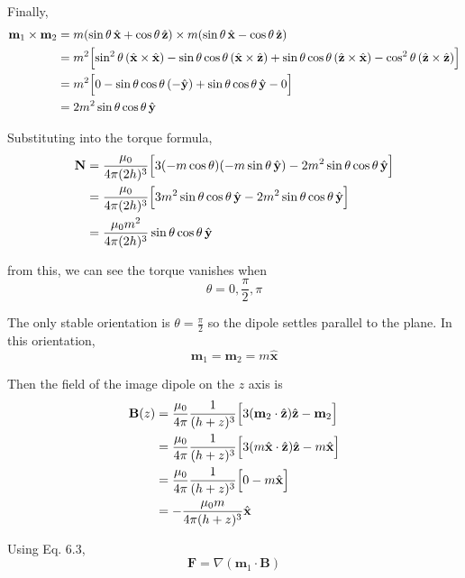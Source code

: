 \documentclass[12pt]{article}
\begin{document}
\begin{enumerate}
Finally,
$$
\begin{aligned}
\mathbf m_1\times \mathbf m_2
&=
m(\sin\theta\,\hat{\mathbf x}+\cos\theta\,\hat{\mathbf z})
\times
m(\sin\theta\,\hat{\mathbf x}-\cos\theta\,\hat{\mathbf z}) \\
&=
m^2
\Bigl[
\sin^2\theta\,(\hat{\mathbf x}\times \hat{\mathbf x})
-\sin\theta\cos\theta\,(\hat{\mathbf x}\times \hat{\mathbf z})
+\sin\theta\cos\theta\,(\hat{\mathbf z}\times \hat{\mathbf x})
-\cos^2\theta\,(\hat{\mathbf z}\times \hat{\mathbf z})
\Bigr] \\
&=
m^2
\Bigl[
0
-\sin\theta\cos\theta\,(-\hat{\mathbf y})
+\sin\theta\cos\theta\,\hat{\mathbf y}
-0
\Bigr] \\
&=
2m^2\sin\theta\cos\theta\,\hat{\mathbf y}
\end{aligned}
$$

Substituting into the torque formula,
$$
\begin{aligned}
\mathbf N
&=
\frac{\mu_0}{4\pi(2h)^3}
\Bigl[
3(-m\cos\theta)(-m\sin\theta\,\hat{\mathbf y})
-
2m^2\sin\theta\cos\theta\,\hat{\mathbf y}
\Bigr] \\
&=
\frac{\mu_0}{4\pi(2h)^3}
\Bigl[
3m^2\sin\theta\cos\theta\,\hat{\mathbf y}
-
2m^2\sin\theta\cos\theta\,\hat{\mathbf y}
\Bigr] \\
&=
\frac{\mu_0 m^2}{4\pi(2h)^3}\sin\theta\cos\theta\,\hat{\mathbf y}
\end{aligned}
$$

from this, we can see the torque vanishes when
$$
\theta=0,\frac{\pi}{2},\pi
$$

The only stable orientation is $\theta=\frac{\pi}{2}$ so the dipole settles parallel to the plane. In this orientation,
$$
\mathbf m_1=\mathbf m_2=m\hat{\mathbf x}
$$

Then the field of the image dipole on the \(z\) axis is
$$
\begin{aligned}
\mathbf B(z)
&=
\frac{\mu_0}{4\pi}\frac{1}{(h+z)^3}
\Bigl[
3(\mathbf m_2\cdot \hat{\mathbf z})\hat{\mathbf z}
-\mathbf m_2
\Bigr] \\
&=
\frac{\mu_0}{4\pi}\frac{1}{(h+z)^3}
\Bigl[
3(m\hat{\mathbf x}\cdot \hat{\mathbf z})\hat{\mathbf z}
-m\hat{\mathbf x}
\Bigr] \\
&=
\frac{\mu_0}{4\pi}\frac{1}{(h+z)^3}
\Bigl[
0-m\hat{\mathbf x}
\Bigr] \\
&=
-\frac{\mu_0 m}{4\pi(h+z)^3}\hat{\mathbf x}
\end{aligned}
$$

Using Eq. \(6.3\),
$$
\mathbf F=\nabla(\mathbf m_1\cdot \mathbf B)
$$


\end{enumerate}
\end{document}
